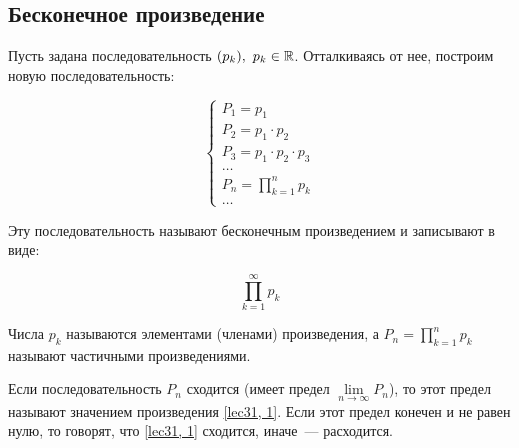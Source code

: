 \documentclass[../../main.tex]{subfiles}
\begin{document}
	\subsection{Бесконечное произведение}

	Пусть задана последовательность $(p_k),\ p_k \in \R$. Отталкиваясь от нее, 
	построим новую последовательность:

	\[
	\begin{cases}
	P_1 = p_1 \\
	P_2 = p_1 \cdot p_2 \\
	P_3 = p_1 \cdot p_2 \cdot p_3 \\
	\ldots \\
	P_n = \prod\limits_{k = 1}^{n} p_k \\
	\ldots
	\end{cases} 
	\]

	Эту последовательность называют бесконечным произведением и записывают в виде:

	\begin{equation} \label{lec31, 1}
		\prod\limits_{k = 1}^{\infty} p_k
	\end{equation}
	
	Числа $p_k$ называются элементами (членами) произведения, а $P_n = 
	\prod\limits_{k = 1}^{n} p_k$ называют частичными произведениями.
	
	Если последовательность $P_n$ сходится (имеет предел $\lim\limits_{n \to 
	\infty}P_n$), то этот предел называют значением произведения \eqref{lec31, 
	1}. Если этот предел конечен и не равен нулю, то говорят, что \eqref{lec31, 
	1} сходится, иначе~--- расходится.
	
\end{document}
